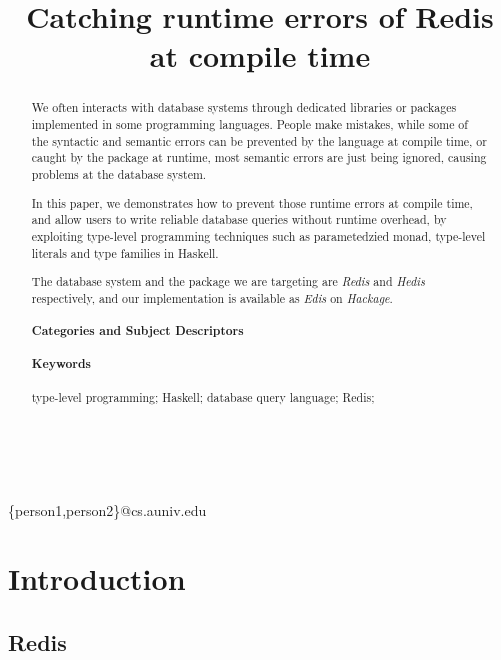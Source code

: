 \documentclass[pldi]{sigplanconf-pldi16}
\begin{document}
\title{Catching runtime errors of Redis at compile time}

%
%

{ \\
  \\
}
{\{person1,person2\}@cs.auniv.edu}

\maketitle

\begin{abstract}
We often interacts with database systems through dedicated libraries or packages
implemented in some programming languages. People make mistakes, while some of
the syntactic and semantic errors can be prevented by the language at compile
time, or caught by the package at runtime, most semantic errors are just
being ignored, causing problems at the database system.

In this paper, we demonstrates how to prevent those runtime errors at compile
time, and allow users to write reliable database queries without runtime overhead,
by exploiting type-level programming techniques such as parametedzied monad,
type-level literals and type families in Haskell.

The database system and the package we are targeting
are \emph{Redis} and \emph{Hedis} respectively, and our implementation is
available as \emph{Edis} on \emph{Hackage}.

\paragraph{Categories and Subject Descriptors}
\paragraph{Keywords}
type-level programming; Haskell; database query language; Redis;
\end{abstract}

\section{Introduction}

\subsection{Redis}
\end{document}

